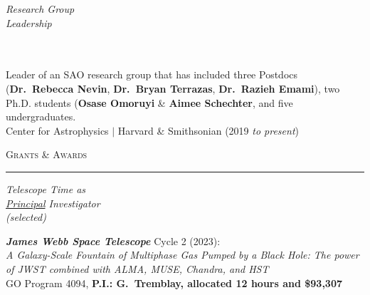 \documentclass[11pt]{article}
\makeatletter
\def\vhrulefill#1{\leavevmode\leaders\hrule\@height#1\hfill \kern\z@}
\makeatother
\begin{document}
\vspace{2mm}






\hspace{2.5mm} \parbox{1.5in}{\textit{Research Group \\ Leadership \\\\\\}} \parbox{5.15in}{Leader of an SAO research group that has included three Postdocs (\textbf{Dr.~Rebecca Nevin}, \textbf{Dr.~Bryan Terrazas}, \textbf{Dr.~Razieh Emami}), two Ph.D. students (\textbf{Osase Omoruyi} \& \textbf{Aimee Schechter}, and five undergraduates.  \\
Center for Astrophysics $|$ Harvard \& Smithsonian (2019 \textit{to present})\\

}



\textsc{Grants \& Awards} \vhrulefill{0.4pt}

\vspace{4mm}


\hspace{2.5mm} \parbox{1.5in}{\textit{Telescope Time as \\ \uline{Principal} Investigator \\ (selected) \\ }} \parbox{5.15in}{\textbf{\textit{James Webb Space Telescope}} Cycle 2 (2023):\\ \textit{A Galaxy-Scale Fountain of Multiphase Gas Pumped by a Black Hole: The power of JWST combined with ALMA, MUSE, Chandra, and HST} \\ GO Program 4094, \textbf{P.I.: G.~Tremblay, allocated 12 hours and \$93,307}} \\



\vspace{4mm}
\end{document}
